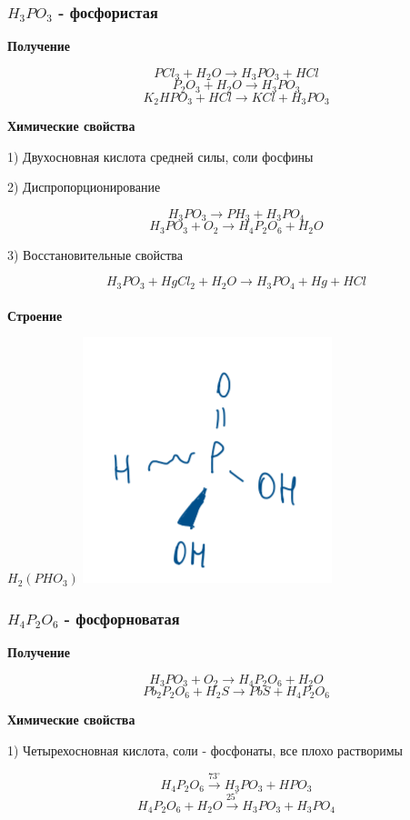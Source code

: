 \documentclass[14pt,a4paper]{scrartcl}
\begin{document}
\subsubsection{$H_3PO_3$ - фосфористая}

\textbf{Получение}

$$PCl_3 + H_2O \rightarrow H_3PO_3 + HCl$$
$$P_2O_3 + H_2O \rightarrow H_3PO_3$$
$$K_2HPO_3 + HCl \rightarrow KCl + H_3PO_3$$

\textbf{Химические свойства}

1) Двухосновная кислота средней силы, соли фосфины

2) Диспропорционирование

$$H_3PO_3 \rightarrow PH_3 + H_3PO_4$$
$$H_3PO_3 + O_2 \rightarrow H_4P_2O_6 + H_2O$$

3) Восстановительные свойства

$$H_3PO_3 + HgCl_2 + H_2O \rightarrow H_3PO_4 + Hg + HCl$$
\\
\textbf{Строение}

$H_2(PHO_3)$
\includegraphics{9v9.png}

\subsubsection{$H_4P_2O_6$ - фосфорноватая}

\textbf{Получение}

$$H_3PO_3 + O_2 \rightarrow H_4P_2O_6 + H_2O$$
$$Pb_2P_2O_6 + H_2S \rightarrow PbS + H_4P_2O_6$$

\textbf{Химические свойства}

1) Четырехосновная кислота, соли - фосфонаты, все плохо растворимы

$$H_4P_2O_6 \xrightarrow{73^{\circ}} H_3PO_3+ HPO_3$$
$$H_4P_2O_6 + H_2O \xrightarrow{25^{\circ}} H_3PO_3 + H_3PO_4$$
\end{document}
